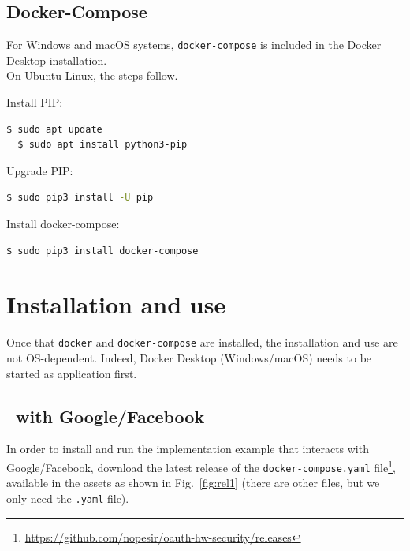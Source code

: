 \subsection{Docker-Compose}
For Windows and macOS systems, \texttt{docker-compose} is included in the Docker Desktop installation.\\
On Ubuntu Linux, the steps follow.

\noindent Install PIP:
\begin{lstlisting}[language=bash]
  $ sudo apt update
  $ sudo apt install python3-pip
\end{lstlisting}

\noindent Upgrade PIP:
\begin{lstlisting}[language=bash]
  $ sudo pip3 install -U pip
\end{lstlisting}

\noindent Install docker-compose:
\begin{lstlisting}[language=bash]
  $ sudo pip3 install docker-compose
\end{lstlisting}

\section{Installation and use}
Once that \texttt{docker} and \texttt{docker-compose} are installed, the installation and use are not OS-dependent. Indeed, Docker Desktop (Windows/macOS) needs to be started as application first.

\subsection{\oauth\ with Google/Facebook}
In order to install and run the implementation example that interacts with Google/Facebook, download the latest release of the \texttt{docker-compose.yaml} file\footnote{\url{https://github.com/nopesir/oauth-hw-security/releases}}, available in the assets as shown in Fig.~\ref{fig:rel1} (there are other files, but we only need the \texttt{.yaml} file).

